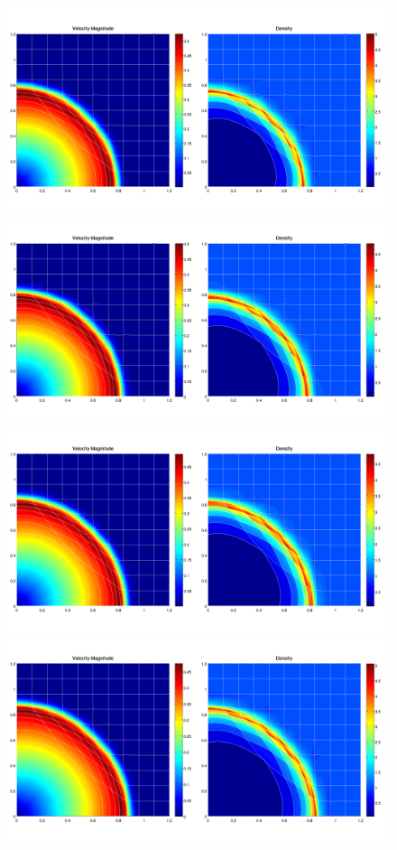 \documentclass[8pt,xcolor=svgnames]{beamer}
\begin{document}
\begin{frame}
\begin{figure}[ht]
\begin{animateinline}[autoplay,width=\textwidth]{1}
    \newframe[1]
    \includegraphics{./Images/SedovAnimation/SedovAnimation_120.png}
    \newframe[1]
    \includegraphics{./Images/SedovAnimation/SedovAnimation_130.png}
    \newframe[1]
    \includegraphics{./Images/SedovAnimation/SedovAnimation_140.png}
    \newframe[1]
    \includegraphics{./Images/SedovAnimation/SedovAnimation_150.png}

\end{animateinline}
\end{figure}
\end{frame}
\end{document}
